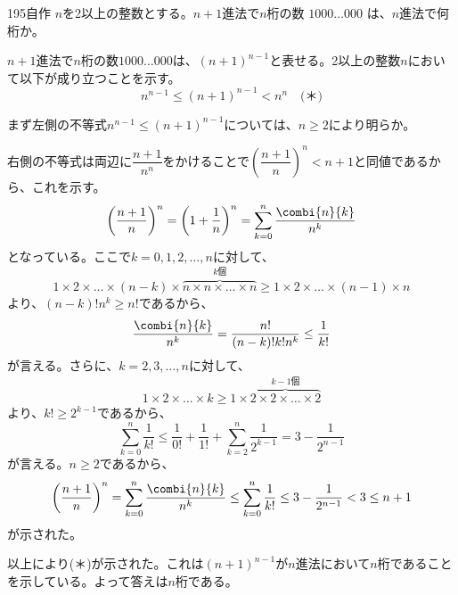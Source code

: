 \begin{prob}{195}{\maru}{自作}
 $n$を2以上の整数とする。$n+1$進法で$n$桁の数 $1000\dots000$ は、$n$進法で何桁か。
\end{prob}

$n+1$進法で$n$桁の数$1000\dots000$は、$(n+1)^{n-1}$と表せる。2以上の整数$n$において以下が成り立つことを示す。
\[ n^{n-1}\le (n+1)^{n-1} < n^n \quad \text{(＊)} \]

まず左側の不等式$n^{n-1}\le (n+1)^{n-1}$については、$n\ge 2$により明らか。

右側の不等式は両辺に$\dfrac{n+1}{n^n}$をかけることで$\left(\dfrac{n+1}{n}\right)^n<n+1$と同値であるから、これを示す。
\[ \left(\frac{n+1}{n}\right)^n = \left(1+\frac{1}{n}\right)^n=\sum_{k=0}^n\frac{\combi{n}{k}}{n^k} \]
となっている。ここで$k=0, 1, 2,\dots, n$に対して、
\[ 1\times 2\times\dots\times(n-k)\times\overbrace{n\times n\times\dots\times n}^{k\text{個}} \ge 1\times 2\times \dots\times (n-1)\times n \]
より、$(n-k)!n^k\ge n!$であるから、
\[ \frac{\combi{n}{k}}{n^k}=\frac{n!}{(n-k)! k! n^k} \le \frac{1}{k!} \]
が言える。さらに、$k=2, 3, \dots, n$に対して、
\[ 1\times 2\times \dots \times k \ge 1\times \overbrace{2\times 2\times \dots \times 2}^{k-1\text{個}} \]
より、$k!\ge 2^{k-1}$であるから、
\[ \sum_{k=0}^n \frac{1}{k!} \le \frac{1}{0!}+\frac{1}{1!}+\sum_{k=2}^n \frac{1}{2^{k-1}} = 3-\frac{1}{2^{n-1}} \]
が言える。$n\ge 2$であるから、
\[ \left(\frac{n+1}{n}\right)^n=\sum_{k=0}^n \frac{\combi{n}{k}}{n^k} \le \sum_{k=0}^n \frac{1}{k!}\le 3-\frac{1}{2^{n-1}}< 3\le n+1 \]
が示された。

以上により(＊)が示された。これは$(n+1)^{n-1}$が$n$進法において$n$桁であることを示している。よって答えは$n$桁である。